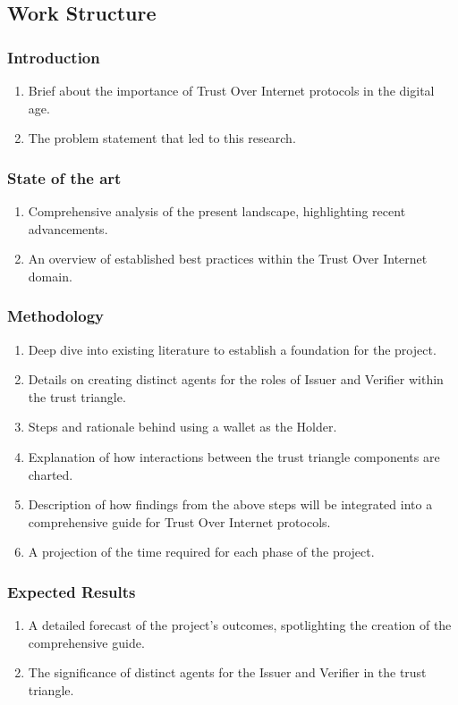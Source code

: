 \subsection{Work Structure}

\subsubsection{Introduction}
\begin{enumerate}
    \item Brief about the importance of Trust Over Internet protocols in the digital age.
    \item The problem statement that led to this research.
\end{enumerate}

\subsubsection{State of the art}
\begin{enumerate}
    \item Comprehensive analysis of the present landscape, highlighting recent advancements.
    \item An overview of established best practices within the Trust Over Internet domain.
\end{enumerate}

\subsubsection{Methodology}
\begin{enumerate}
    \item Deep dive into existing literature to establish a foundation for the project.
    \item Details on creating distinct agents for the roles of Issuer and Verifier within the trust triangle.
    \item Steps and rationale behind using a wallet as the Holder.
    \item Explanation of how interactions between the trust triangle components are charted.
    \item Description of how findings from the above steps will be integrated into a comprehensive guide for Trust Over Internet protocols.
    \item A projection of the time required for each phase of the project.
\end{enumerate}

\subsubsection{Expected Results}
\begin{enumerate}
    \item A detailed forecast of the project's outcomes, spotlighting the creation of the comprehensive guide.
    \item The significance of distinct agents for the Issuer and Verifier in the trust triangle.
\end{enumerate}

